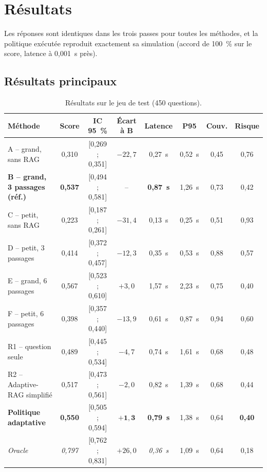 \documentclass[11pt,a4paper]{article}
\begin{document}
\section{Résultats}\label{sec:resultats}

Les réponses sont identiques dans les trois passes pour toutes les méthodes, et la politique exécutée
reproduit exactement sa simulation (accord de 100~\% sur le score, latence à 0,001~s près).

\subsection{Résultats principaux}

\begin{table}[H]
\centering\small\setlength{\tabcolsep}{4pt}
\begin{tabular}{l c c c c c c c}
\toprule
Méthode & Score & IC 95~\% & Écart à B & Latence & P95 & Couv. & Risque \\
\midrule
A -- grand, sans RAG & 0,310 & [0,269 ; 0,351] & $-22{,}7$ & 0,27~s & 0,52~s & 0,45 & 0,76 \\
\textbf{B -- grand, 3 passages (réf.)} & \textbf{0,537} & [0,494 ; 0,581] & -- & \textbf{0,87~s} & 1,26~s & 0,73 & 0,42 \\
C -- petit, sans RAG & 0,223 & [0,187 ; 0,261] & $-31{,}4$ & 0,13~s & 0,25~s & 0,51 & 0,93 \\
D -- petit, 3 passages & 0,414 & [0,372 ; 0,457] & $-12{,}3$ & 0,35~s & 0,53~s & 0,88 & 0,57 \\
E -- grand, 6 passages & 0,567 & [0,523 ; 0,610] & $+3{,}0$ & 1,57~s & 2,23~s & 0,75 & 0,40 \\
F -- petit, 6 passages & 0,398 & [0,357 ; 0,440] & $-13{,}9$ & 0,61~s & 0,87~s & 0,94 & 0,60 \\
\midrule
R1 -- question seule & 0,489 & [0,445 ; 0,534] & $-4{,}7$ & 0,74~s & 1,61~s & 0,68 & 0,48 \\
R2 -- Adaptive-RAG simplifié & 0,517 & [0,473 ; 0,561] & $-2{,}0$ & 0,82~s & 1,39~s & 0,68 & 0,44 \\
\textbf{Politique adaptative} & \textbf{0,550} & [0,505 ; 0,594] & $\mathbf{+1{,}3}$ & \textbf{0,79~s} & 1,38~s & 0,64 & \textbf{0,40} \\
\midrule
\textit{Oracle} & \textit{0,797} & [0,762 ; 0,831] & $+26{,}0$ & \textit{0,36~s} & 1,09~s & 0,64 & 0,18 \\
\bottomrule
\end{tabular}
\caption{Résultats sur le jeu de test (450 questions).}
\label{tab:resultats}
\end{table}
\end{document}
